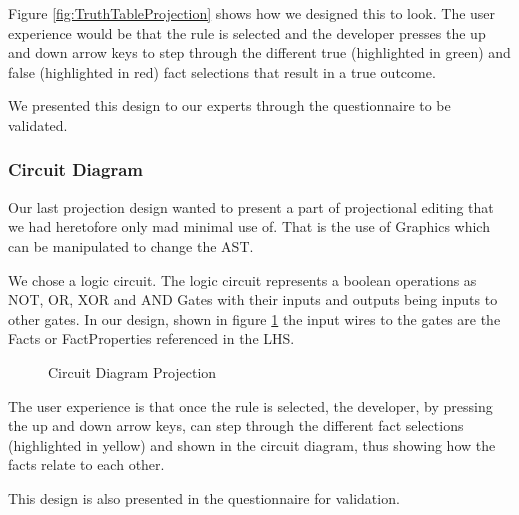 Figure \ref{fig:TruthTableProjection} shows how we designed this to look.
The user experience would be that the rule is selected and the developer presses the up and down arrow keys to step through the different true (highlighted in green) and false (highlighted in red) fact selections that result in a true outcome.

We presented this design to our experts through the questionnaire to be validated.

\subsubsection{Circuit Diagram}
Our last projection design wanted to present a part of projectional editing that we had heretofore only mad minimal use of.
That is the use of Graphics which can be manipulated to change the AST.

We chose a logic circuit. The logic circuit represents a boolean operations as NOT, OR, XOR and AND Gates with their inputs and outputs being inputs to other gates.
In our design, shown in figure \ref{fig:CircuitDiagramProjection} the input wires to the gates are the Facts or FactProperties referenced in the LHS.

\begin{figure}[h]
    \centering
    \caption{Circuit Diagram Projection}
    \label{fig:CircuitDiagramProjection}
\end{figure}

The user experience is that once the rule is selected, the developer, by pressing the up and down arrow keys, can step through the different fact selections (highlighted in yellow) and shown in the circuit diagram, thus showing how the facts relate to each other.

This design is also presented in the questionnaire for validation.

